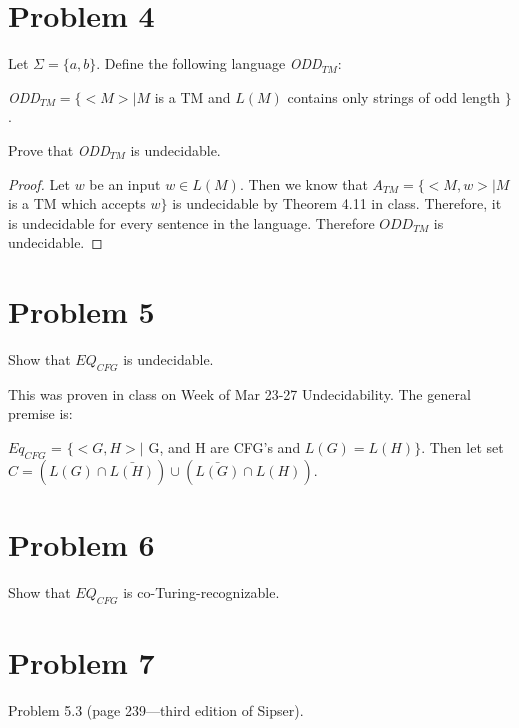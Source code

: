\documentclass[11pt]{article}
\begin{document}
\newpage
\section*{Problem 4}

Let $\Sigma=\{a,b\}$. Define the following language {\em ODD}$_{TM}$:

{\em ODD}$_{TM}=\{ <M>|M$ is a TM and $L(M)$ contains only strings of odd length $\}$.

Prove that {\em ODD}$_{TM}$ is undecidable.



\begin{proof}

Let $w$ be an input $w \in L(M)$. Then we know that $A_{TM} = \{<M, w> | M$ is a TM which accepts $w \}$ is undecidable by Theorem 4.11 in class. Therefore, it is undecidable for every sentence in the language. Therefore $ODD_{TM}$ is undecidable.
\end{proof}


\newpage
\section*{Problem 5}

Show that $EQ_{CFG}$ is undecidable.
\newline

This was proven in class on Week of Mar 23-27 Undecidability. The general premise is:

$Eq_{CFG}$ = $\{ <G, H> | $ G, and H are CFG's and $L(G) = L(H) \}$. Then let set $C = (L(G) \cap \bar{L(H)}) \cup (\bar{L(G)} \cap L(H))$. 

\newpage
\section*{Problem 6}

Show that $EQ_{CFG}$ is co-Turing-recognizable.
\newline


\newpage
\section*{Problem 7}

Problem 5.3 (page 239---third edition of Sipser).
\newline
\end{document}
